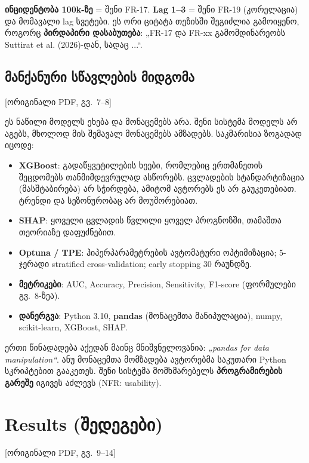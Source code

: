 \documentclass[11pt,a4paper]{article}
\newcommand{\imp}[1]{\textbf{\color{importred}#1}}
\newcommand{\pg}[1]{{\small\color{gray}[ორიგინალი PDF, გვ.~#1]}}
\begin{document}
\begin{etl}
\textbf{ინციდენტობა 100k-ზე} = შენი FR-17. \textbf{Lag 1--3} = შენი FR-19 (კორელაცია) და მომავალი lag სვეტები.
ეს ორი ციტატა თეზისში შეგიძლია გამოიყენო, როგორც \imp{პირდაპირი დასაბუთება}: „FR-17 და FR-xx
გამომდინარეობს Suttirat et al. (2026)-დან, სადაც ...“.
\end{etl}

\subsection*{მანქანური სწავლების მიდგომა} \pg{7--8}

\begin{skipbox}
ეს ნაწილი მოდელს ეხება და მონაცემებს არა. შენი სისტემა მოდელს არ აგებს, მხოლოდ მის შემავალ მონაცემებს ამზადებს.
საკმარისია ზოგადად იცოდე:
\begin{itemize}[leftmargin=1.5em]
  \item \textbf{XGBoost}: გადაწყვეტილების ხეები, რომლებიც ერთმანეთის შეცდომებს თანმიმდევრულად ასწორებს.
        ცვლადების სტანდარტიზაცია (მასშტაბირება) არ სჭირდება, ამიტომ ავტორებს ეს არ გაუკეთებიათ.
        ტრენდი და სეზონურობაც არ მოუშორებიათ.
  \item \textbf{SHAP}: ყოველი ცვლადის წვლილი ყოველ პროგნოზში, თამაშთა თეორიაზე დაფუძნებით.
  \item \textbf{Optuna / TPE}: ჰიპერპარამეტრების ავტომატური ოპტიმიზაცია; 5-ჯერადი stratified cross-validation; early stopping 30 რაუნდზე.
  \item \textbf{მეტრიკები}: AUC, Accuracy, Precision, Sensitivity, F1-score (ფორმულები გვ.~8-ზეა).
  \item \textbf{დანერგვა}: Python 3.10, \imp{pandas} (მონაცემთა მანიპულაცია), numpy, scikit-learn, XGBoost, SHAP.
\end{itemize}
\end{skipbox}

\begin{etl}
ერთი წინადადება აქედან მაინც მნიშვნელოვანია: \textit{„pandas for data manipulation“}. ანუ მონაცემთა
მომზადება ავტორებმა საკუთარი Python სკრიპტებით გააკეთეს. შენი სისტემა მომხმარებელს
\imp{პროგრამირების გარეშე} იგივეს აძლევს (NFR: usability).
\end{etl}

\section{Results (შედეგები)} \pg{9--14}
\end{document}
